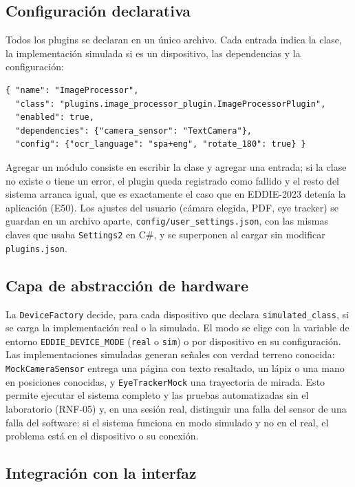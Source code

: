 \subsection{Configuración declarativa}

Todos los plugins se declaran en un único archivo. Cada entrada indica la clase, la implementación simulada si es un dispositivo, las dependencias y la configuración:

\begin{verbatim}
{ "name": "ImageProcessor",
  "class": "plugins.image_processor_plugin.ImageProcessorPlugin",
  "enabled": true,
  "dependencies": {"camera_sensor": "TextCamera"},
  "config": {"ocr_language": "spa+eng", "rotate_180": true} }
\end{verbatim}

Agregar un módulo consiste en escribir la clase y agregar una entrada; si la clase no existe o tiene un error, el plugin queda registrado como fallido y el resto del sistema arranca igual, que es exactamente el caso que en EDDIE-2023 detenía la aplicación (E50). Los ajustes del usuario (cámara elegida, PDF, eye tracker) se guardan en un archivo aparte, \texttt{config/user\_settings.json}, con las mismas claves que usaba \texttt{Settings2} en C\#, y se superponen al cargar sin modificar \texttt{plugins.json}.

\subsection{Capa de abstracción de hardware}

La \texttt{DeviceFactory} decide, para cada dispositivo que declara \texttt{simulated\_class}, si se carga la implementación real o la simulada. El modo se elige con la variable de entorno \texttt{EDDIE\_DEVICE\_MODE} (\texttt{real} o \texttt{sim}) o por dispositivo en su configuración. Las implementaciones simuladas generan señales con verdad terreno conocida: \texttt{MockCameraSensor} entrega una página con texto resaltado, un lápiz o una mano en posiciones conocidas, y \texttt{EyeTrackerMock} una trayectoria de mirada. Esto permite ejecutar el sistema completo y las pruebas automatizadas sin el laboratorio (RNF-05) y, en una sesión real, distinguir una falla del sensor de una falla del software: si el sistema funciona en modo simulado y no en el real, el problema está en el dispositivo o su conexión.

\subsection{Integración con la interfaz}

